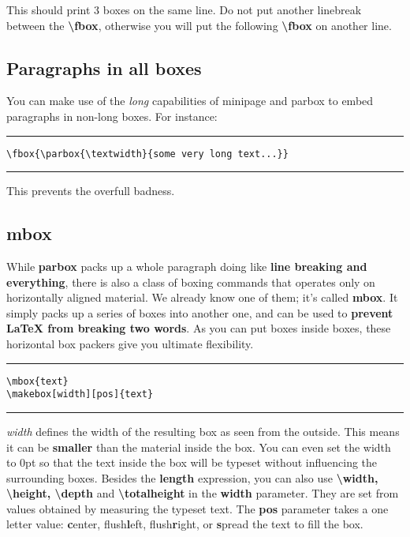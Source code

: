 This should print 3 boxes on the same line. Do not put another linebreak between the \textbf{\textbackslash fbox}, otherwise you will put the following \textbf{\textbackslash fbox} on another line.

\subsection{Paragraphs in all boxes}
You can make use of the \textit{long} capabilities of minipage and parbox to embed paragraphs in non-long boxes. For instance:

\noindent{}

\noindent\vspace{1em}\hrule
\begin{verbatim}
\fbox{\parbox{\textwidth}{some very long text...}}
\end{verbatim}
\noindent\hrule\vspace{1em}

This prevents the overfull badness.

\subsection{mbox}
While \textbf{parbox} packs up a whole paragraph doing like \textbf{line breaking and everything}, there is also a class of boxing commands that operates only on horizontally aligned material. We already know one of them; it's called \textbf{mbox}. It simply packs up a series of boxes into another one, and can be used to \textbf{prevent \LaTeX{} from breaking two words}. As you can put boxes inside boxes, these horizontal box packers give you ultimate flexibility.

\noindent\vspace{1em}\hrule
\begin{verbatim}
\mbox{text}
\makebox[width][pos]{text}
\end{verbatim}
\noindent\hrule\vspace{1em}

\emph{width} defines the width of the resulting box as seen from the outside. This means it can be \textbf{smaller} than the material inside the box. You can even set the width to 0pt so that the text inside the box will be typeset without influencing the surrounding boxes. Besides the \textbf{length} expression, you can also use \textbf{\textbackslash width, \textbackslash height, \textbackslash depth} and \textbf{\textbackslash totalheight} in the \textbf{width} parameter. They are set from values obtained by measuring the typeset text. The \textbf{pos} parameter takes a one letter value: \textbf{c}enter, flush\textbf{l}eft, flush\textbf{r}ight, or \textbf{s}pread the text to fill the box.

